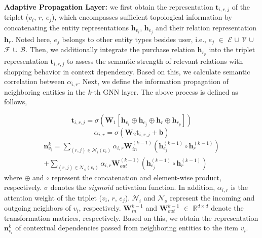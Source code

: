 \documentclass[conference]{IEEEtran}
\begin{document}
\textbf{Adaptive Propagation Layer:} we first obtain the representation $\textbf{t}_{i,r,j}$  of the triplet ($v_i$, $r$, $e_j$), which encompasses sufficient topological information by concatenating the entity  representations $\textbf{h}_{v_i}$,  $\textbf{h}_{e_j}$  and their relation representation $\textbf{h}_r$\cite{triplet}. Noted here, \emph{$e_j$} belongs to other entity types besides user, i.e.,  \emph{$e_j$} $\in$ $\mathcal{E}$ $\cup$ $\mathcal{V}$ $\cup$ $\mathcal{F}$ $\cup$ $\mathcal{B}$. Then, we additionally integrate the purchase relation $\textbf{h}_{r_p}$ into the triplet representation $\textbf{t}_{i,r,j}$ to  assess the semantic strength of  relevant relations with shopping behavior in context dependency. Based on this, we calculate semantic correlation between $\alpha_{i,r}$. Next, we define the information propagation of neighboring entities in the $k$-th GNN layer. The above process is defined as follows, 

\begin{equation}
 \textbf{t}_{i,r,j} = \sigma (\textbf{W}_1 [ \textbf{h}_{v_i} \oplus \textbf{h}_{e_j} \oplus \textbf{h}_r\oplus \textbf{h}_{r_p}])
\end{equation}
\begin{equation}
 \alpha_{i,r} = \sigma (\textbf{W}_2 \textbf{t}_{i,r,j} + \textbf{b}) 
\end{equation}
\begin{equation}
\begin{split}
 \textbf{n}_{v_i}^{k} = \sum_{(r,j) \in \mathcal{N}_{i}(v_i)} \alpha_{i,r} \textbf{W}_{in}^{(k-1)} (\textbf{h}_{e_j}^{(k-1)} \circ \textbf{h}_r^{(k-1)}) \\ + \sum_{(r,j) \in \mathcal{N}_{o}(v_i)} \alpha_{i,r} \textbf{W}_{out}^{(k-1)}  (\textbf{h}_{e_j}^{(k-1)} \circ \textbf{h}_r^{(k-1)})
 \end{split}
\end{equation} 
where $\oplus$ and $\circ$ represent the concatenation and  element-wise product, respectively. $\sigma$ denotes  the $sigmoid$ activation function. In addition, $\alpha_{i,r}$ is the attention weight of the triplet ($v_i$, $r$, $e_j$).  $\mathcal{N}_{i}$ and $\mathcal{N}_{o}$ represent the incoming and outgoing neighbors of $v_i$, respectively. $\textbf{W}_{in}^{k-1}$ and $\textbf{W}_{out}^{k-1}$ $\in$ $\mathbb{R}^{d \times d}$ denote the transformation matrices, respectively. Based on this, we obtain the representation $\textbf{n}_{v_i}^{k}$ of contextual dependencies passed from neighboring entities to the item $v_i$. 
\end{document}
